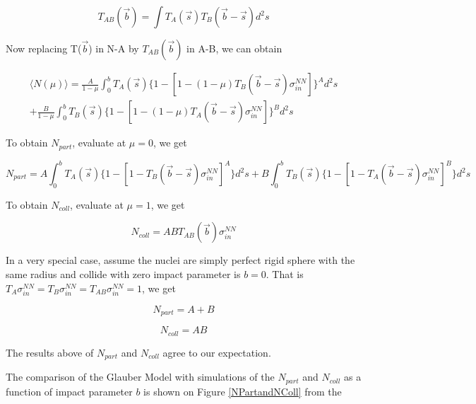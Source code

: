 \begin{equation}
T_{AB}(\vec{b}) = \int T_A(\vec{s}) T_B(\vec{b} - \vec{s}) d^2s 
\end{equation}



Now replacing T($\vec{b}$) in N-A by $T_{AB}(\vec{b})$ in A-B, we can obtain

\begin{equation}
\begin{multlined}
\langle N(\mu) \rangle = \frac{A}{1-\mu} \int_0^b T_A(\vec{s}) \{1 - [1 - (1 - \mu) T_{B}(\vec{b}-\vec{s}) \sigma_{in}^{NN}]\}^A d^2s  \\
  +  \frac{B}{1-\mu} \int_0^b T_B(\vec{s}) \{1 - [1 - (1 - \mu) T_{A}(\vec{b}-\vec{s}) \sigma_{in}^{NN}]\}^B d^2s
\end{multlined}
\end{equation}


To obtain $N_{part}$, evaluate at $\mu = 0$, we get 

\begin{equation}
N_{part} =  A \int_0^b T_A(\vec{s}) \{1 - [1 - T_{B}(\vec{b}-\vec{s}) \sigma_{in}^{NN}]^A\}d^2s +  B \int_0^b T_B(\vec{s}) \{1 - [1 - T_{A}(\vec{b}-\vec{s}) \sigma_{in}^{NN}]^B\} d^2s
\end{equation}

To obtain $N_{coll}$, evaluate at $\mu = 1$, we get

\begin{equation}
N_{coll} = AB T_{AB}(\vec{b}) \sigma_{in}^{NN}
\end{equation}

In a very special case, assume the nuclei are simply perfect rigid sphere with the same radius and collide with zero impact parameter is $b=0$. That is $T_{A} \sigma_{in}^{NN} = T_{B} \sigma_{in}^{NN} = T_{AB} \sigma_{in}^{NN} = 1$, we get 


\begin{equation}
N_{part} = A + B
\end{equation}

\begin{equation}
N_{coll} = AB
\end{equation}

The results above of $N_{part}$ and $N_{coll}$ agree to our expectation. 

The comparison of the Glauber Model with simulations of the $N_{part}$ and $N_{coll}$ as a function of impact parameter $b$ is shown on Figure \ref{NPartandNColl} from the \cite{CentPlot}

